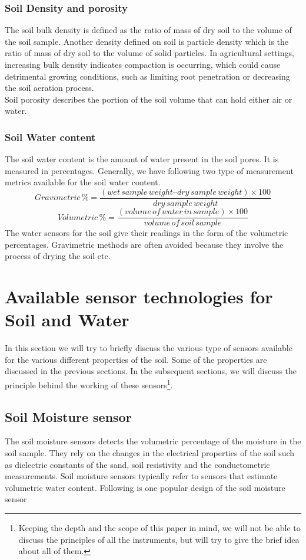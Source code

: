 \documentclass[11pt]{article}
\begin{document}
\subsubsection{Soil Density and porosity}
The soil bulk density is defined as the ratio of mass of dry soil to the volume of the soil sample. Another density defined on soil is particle density which is the ratio of mass of dry soil to the volume of solid particles. In agricultural settings,
increasing bulk density indicates
compaction is occurring, which
could cause detrimental growing
conditions, such as limiting root
penetration or decreasing the soil
aeration process. \\
Soil porosity describes the portion
of the soil volume that can hold either air or water.
\subsubsection{Soil Water content}
The soil water content is the amount of water present in the soil pores. It is measured in percentages. Generally, we have following two type of measurement metrics available for the soil water content. \\
\[Gravimetric\, \% = \frac{(wet\,sample\,weight – dry\,sample\,weight) × 100}{dry\,sample\,weight} \]
\[Volumetric\, \% = \frac{(volume\,of\,water\,in\,sample) × 
100}{volume\,of\,soil\,sample} \]
The water sensors for the soil give their readings in the form of the volumetric percentages. Gravimetric methods are often avoided because they involve the process of drying the soil etc. 
\section{Available sensor technologies for Soil and Water}
In this section we will try to briefly discuss the various type of sensors available for the various different properties of the soil. Some of the properties are discussed in the previous sections. In the subsequent sections, we will discuss the principle behind the working of these sensors\footnote{Keeping the depth and the scope of this paper in mind, we will not be able to discuss the principles of all the instruments, but will try to give the brief idea about all of them.}.
\subsection{Soil Moisture sensor}
The soil moisture sensors detects the volumetric percentage of the moisture in the soil sample. They rely on the changes in the electrical properties of the soil such as dielectric constants of the sand, soil resistivity and the conductometric measurements. Soil moisture sensors typically refer to sensors that estimate volumetric water content. Following is one popular design of the soil moisture sensor\cite{ref2}
\end{document}
